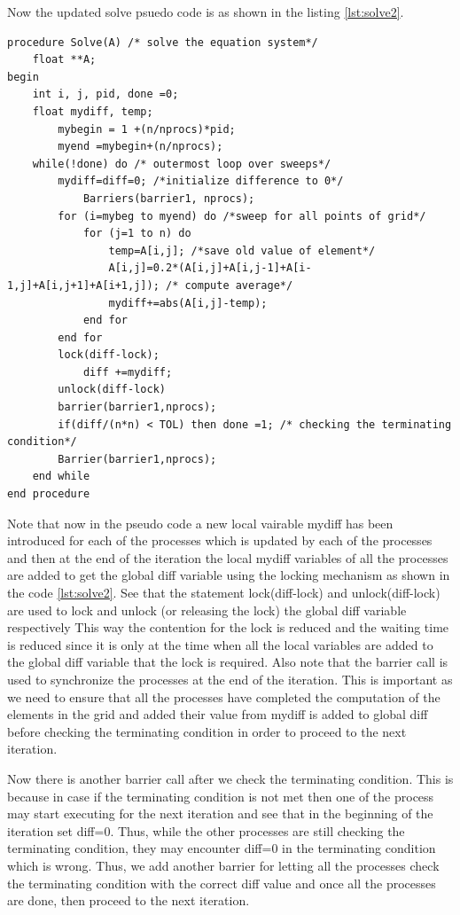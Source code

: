\documentclass[12pt]{article}
\begin{document}
Now the updated solve psuedo code is as shown in the listing \ref{lst:solve2}.
\begin{lstlisting}[caption={Updated Solve Function},captionpos=b,label={lst:solve2}]
procedure Solve(A) /* solve the equation system*/
    float **A;
begin
    int i, j, pid, done =0;
    float mydiff, temp;
        mybegin = 1 +(n/nprocs)*pid;
        myend =mybegin+(n/nprocs);
    while(!done) do /* outermost loop over sweeps*/
        mydiff=diff=0; /*initialize difference to 0*/
            Barriers(barrier1, nprocs);
        for (i=mybeg to myend) do /*sweep for all points of grid*/
            for (j=1 to n) do
                temp=A[i,j]; /*save old value of element*/
                A[i,j]=0.2*(A[i,j]+A[i,j-1]+A[i-1,j]+A[i,j+1]+A[i+1,j]); /* compute average*/
                mydiff+=abs(A[i,j]-temp);
            end for
        end for
        lock(diff-lock);
            diff +=mydiff;
        unlock(diff-lock)
        barrier(barrier1,nprocs);
        if(diff/(n*n) < TOL) then done =1; /* checking the terminating condition*/
        Barrier(barrier1,nprocs);
    end while
end procedure
\end{lstlisting}
Note that now in the pseudo code a new local vairable mydiff has been introduced for each of the processes
which is updated by each of the processes and then at the end of the iteration the local mydiff variables of all the processes are added to get the global diff variable
using the locking mechanism as shown in the code \ref{lst:solve2}. See that the statement lock(diff-lock) and unlock(diff-lock) are used to lock and unlock (or releasing the lock) 
the global diff variable respectively
This way the contention for the lock is reduced and the waiting time is reduced since it is only at the time when all the
local variables are added to the global diff variable that the lock is required.
Also note that the barrier call is used to synchronize the processes at the end of the iteration. This is important as we need to ensure that all the processes have completed the computation of the elements in the grid and added 
their value from mydiff is added to global diff before checking the terminating condition in order to proceed to the next iteration.

Now there is another barrier call after we check the terminating condition. This is because in case if the terminating condition is not met then one of the process may 
start executing for the next iteration and see that in the beginning of the iteration set diff=0.
Thus, while the other processes are still checking the terminating condition, 
they may encounter diff=0 in the terminating condition which is wrong. Thus, we add another barrier for letting all the processes
check the terminating condition with the correct diff value and once all the processes are done, then proceed to the next iteration.
\end{document}
